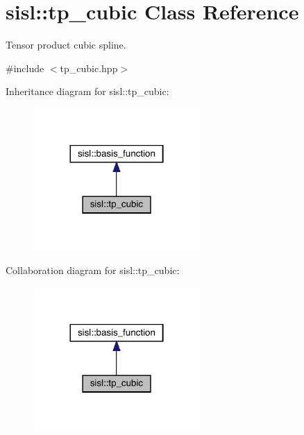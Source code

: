 \hypertarget{classsisl_1_1tp__cubic}{}\section{sisl\+:\+:tp\+\_\+cubic Class Reference}
\label{classsisl_1_1tp__cubic}


Tensor product cubic spline.  




{\ttfamily \#include $<$tp\+\_\+cubic.\+hpp$>$}



Inheritance diagram for sisl\+:\+:tp\+\_\+cubic\+:\nopagebreak
\begin{figure}[H]
\begin{center}
\leavevmode
\includegraphics[width=180pt]{classsisl_1_1tp__cubic__inherit__graph}
\end{center}
\end{figure}


Collaboration diagram for sisl\+:\+:tp\+\_\+cubic\+:\nopagebreak
\begin{figure}[H]
\begin{center}
\leavevmode
\includegraphics[width=180pt]{classsisl_1_1tp__cubic__coll__graph}
\end{center}
\end{figure}
